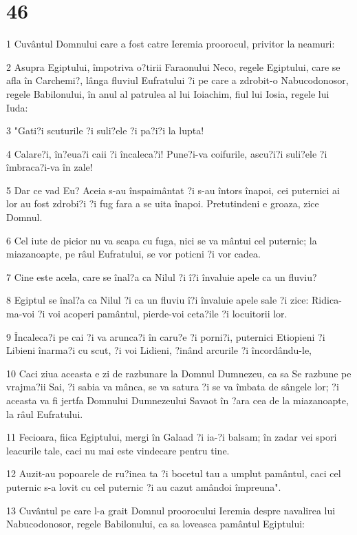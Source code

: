 \chapter{46}

\par 1 Cuvântul Domnului care a fost catre Ieremia proorocul, privitor la neamuri:
\par 2 Asupra Egiptului, împotriva o?tirii Faraonului Neco, regele Egiptului, care se afla în Carchemi?, lânga fluviul Eufratului ?i pe care a zdrobit-o Nabucodonosor, regele Babilonului, în anul al patrulea al lui Ioiachim, fiul lui Iosia, regele lui Iuda:
\par 3 "Gati?i scuturile ?i suli?ele ?i pa?i?i la lupta!
\par 4 Calare?i, în?eua?i caii ?i încaleca?i! Pune?i-va coifurile, ascu?i?i suli?ele ?i îmbraca?i-va în zale!
\par 5 Dar ce vad Eu? Aceia s-au înspaimântat ?i s-au întors înapoi, cei puternici ai lor au fost zdrobi?i ?i fug fara a se uita înapoi. Pretutindeni e groaza, zice Domnul.
\par 6 Cel iute de picior nu va scapa cu fuga, nici se va mântui cel puternic; la miazanoapte, pe râul Eufratului, se vor poticni ?i vor cadea.
\par 7 Cine este acela, care se înal?a ca Nilul ?i î?i învaluie apele ca un fluviu?
\par 8 Egiptul se înal?a ca Nilul ?i ca un fluviu î?i învaluie apele sale ?i zice: Ridica-ma-voi ?i voi acoperi pamântul, pierde-voi ceta?ile ?i locuitorii lor.
\par 9 Încaleca?i pe cai ?i va arunca?i în caru?e ?i porni?i, puternici Etiopieni ?i Libieni înarma?i cu scut, ?i voi Lidieni, ?inând arcurile ?i încordându-le,
\par 10 Caci ziua aceasta e zi de razbunare la Domnul Dumnezeu, ca sa Se razbune pe vrajma?ii Sai, ?i sabia va mânca, se va satura ?i se va îmbata de sângele lor; ?i aceasta va fi jertfa Domnului Dumnezeului Savaot în ?ara cea de la miazanoapte, la râul Eufratului.
\par 11 Fecioara, fiica Egiptului, mergi în Galaad ?i ia-?i balsam; în zadar vei spori leacurile tale, caci nu mai este vindecare pentru tine.
\par 12 Auzit-au popoarele de ru?inea ta ?i bocetul tau a umplut pamântul, caci cel puternic s-a lovit cu cel puternic ?i au cazut amândoi împreuna".
\par 13 Cuvântul pe care l-a grait Domnul proorocului Ieremia despre navalirea lui Nabucodonosor, regele Babilonului, ca sa loveasca pamântul Egiptului:
